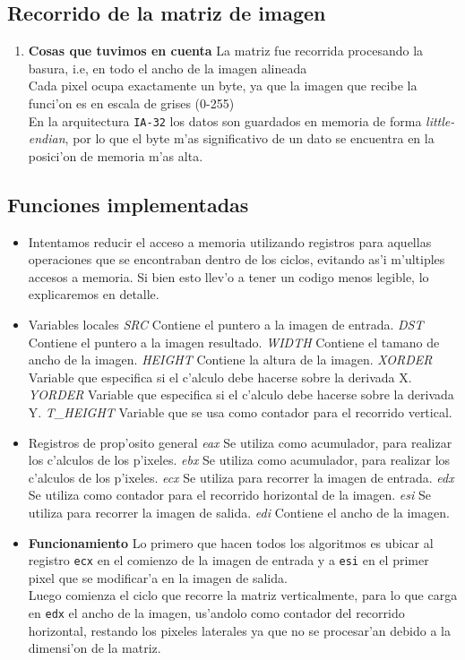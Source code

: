 \documentclass[11pt]{article}
\begin{document}
\newpage
\subsection{Recorrido de la matriz de imagen}
\begin{enumerate}
\item \textbf{Cosas que tuvimos en cuenta} 
\subitem La matriz fue recorrida procesando la basura, i.e, en todo el ancho de la imagen alineada \\
\subitem Cada pixel ocupa exactamente un byte, ya que la imagen que recibe la funci'on es en escala de grises (0-255)  \\
\subitem En la arquitectura \verb'IA-32' los datos son guardados en memoria de forma \emph{little-endian}, por lo que el byte m'as significativo de un dato se encuentra en la posici'on de memoria m'as alta.
\end{enumerate}

\subsection{Funciones implementadas}
\begin{itemize}
\item Intentamos reducir el acceso a memoria utilizando registros para aquellas operaciones que se encontraban dentro de los ciclos, evitando as'i m'ultiples accesos a memoria. Si bien esto llev'o a tener un codigo menos legible, lo explicaremos en detalle.
\item Variables locales
\subitem \textit{SRC} Contiene el puntero a la imagen de entrada.
\subitem \textit{DST} Contiene el puntero a la imagen resultado.
\subitem \textit{WIDTH} Contiene el tamano de ancho de la imagen.
\subitem \textit{HEIGHT} Contiene la altura de la imagen.
\subitem \textit{XORDER} Variable que especifica si el c'alculo debe hacerse sobre la derivada X.
\subitem \textit{YORDER} Variable que especifica si el c'alculo debe hacerse sobre la derivada Y.
\subitem \textit{T\_HEIGHT} Variable que se usa como contador para el recorrido vertical.
\item Registros de prop'osito general 
\subitem \textit{eax} Se utiliza como acumulador, para realizar los c'alculos de los p'ixeles.
\subitem \textit{ebx} Se utiliza como acumulador, para realizar los c'alculos de los p'ixeles.
\subitem \textit{ecx} Se utiliza para recorrer la imagen de entrada.
\subitem \textit{edx} Se utiliza como contador para el recorrido horizontal de la imagen.
\subitem \textit{esi} Se utiliza para recorrer la imagen de salida.
\subitem \textit{edi} Contiene el ancho de la imagen.
\item \textbf{Funcionamiento}
\subitem Lo primero que hacen todos los algoritmos es ubicar al registro \verb'ecx' en el comienzo de la imagen de entrada y a \verb'esi' en el primer pixel que se modificar'a en la imagen de salida.\\
Luego comienza el ciclo que recorre la matriz verticalmente, para lo que carga en \verb'edx' el ancho de la imagen, us'andolo como contador del recorrido horizontal, restando los pixeles laterales ya que no se procesar'an debido a la dimensi'on de la matriz.
\end{itemize}
\end{document}
